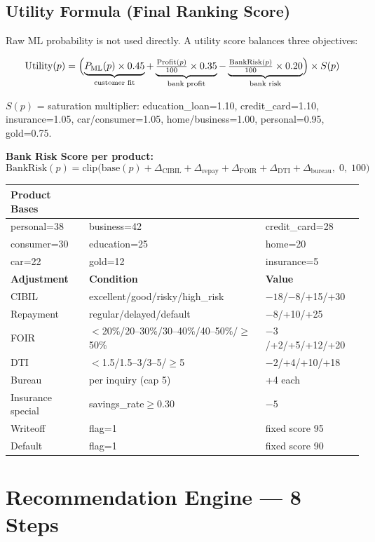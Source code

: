 \documentclass[12pt,a4paper]{article}
\begin{document}
\subsection{Utility Formula (Final Ranking Score)}

Raw ML probability is not used directly. A utility score balances three objectives:

\[
\text{Utility}(p) = \Bigl(
  \underbrace{P_{\text{ML}}(p) \times 0.45}_{\text{customer fit}} +
  \underbrace{\tfrac{\text{Profit}(p)}{100} \times 0.35}_{\text{bank profit}} -
  \underbrace{\tfrac{\text{BankRisk}(p)}{100} \times 0.20}_{\text{bank risk}}
\Bigr) \times S(p)
\]

$S(p)$ = saturation multiplier: education\_loan=1.10, credit\_card=1.10, insurance=1.05, car/consumer=1.05, home/business=1.00, personal=0.95, gold=0.75.

\textbf{Bank Risk Score per product:}
\[
\text{BankRisk}(p) = \text{clip}\bigl(\text{base}(p) + \Delta_\text{CIBIL} + \Delta_\text{repay} + \Delta_\text{FOIR} + \Delta_\text{DTI} + \Delta_\text{bureau},\; 0,\; 100\bigr)
\]

\begin{tabular}{lll}
\toprule
\textbf{Product Bases} & & \\
\midrule
personal=38 & business=42 & credit\_card=28 \\
consumer=30 & education=25 & home=20 \\
car=22 & gold=12 & insurance=5 \\
\midrule
\textbf{Adjustment} & \textbf{Condition} & \textbf{Value} \\
\midrule
CIBIL & excellent/good/risky/high\_risk & $-18$/$-8$/+15/+30 \\
Repayment & regular/delayed/default & $-8$/+10/+25 \\
FOIR & $<$20\%/20--30\%/30--40\%/40--50\%/$\geq$50\% & $-3$/+2/+5/+12/+20 \\
DTI & $<$1.5/1.5--3/3--5/$\geq$5 & $-2$/+4/+10/+18 \\
Bureau & per inquiry (cap 5) & +4 each \\
Insurance special & savings\_rate$\geq$0.30 & $-5$ \\
Writeoff & flag=1 & fixed score 95 \\
Default & flag=1 & fixed score 90 \\
\bottomrule
\end{tabular}

\newpage
\section{Recommendation Engine — 8 Steps}
\end{document}

